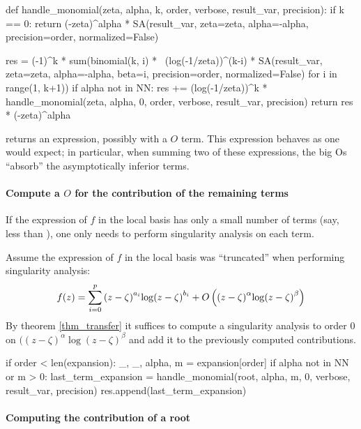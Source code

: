 \documentclass[../main.tex]{subfiles}
\begin{document}
\begin{pyblock}
def handle_monomial(zeta, alpha, k, order, verbose, result_var, precision):
	if k == 0:
		return (-zeta)^alpha * SA(result_var, zeta=zeta, alpha=-alpha,
								  precision=order, normalized=False)
	
	res = (-1)^k * sum(binomial(k, i) * \
						(log(-1/zeta))^(k-i) * SA(result_var,
												  zeta=zeta,
												  alpha=-alpha,
												  beta=i,
												  precision=order,
												  normalized=False)
					   for i in range(1, k+1))
	if alpha not in NN:
		res += (log(-1/zeta))^k * handle_monomial(zeta, alpha, 0,
												  order, verbose,
												  result_var, precision)
	return res * (-zeta)^alpha
\end{pyblock}

\begin{remark}
	 returns an expression, possibly with a $O$ term. This expression behaves as one would expect; in particular, when summing two of these expressions, the big Os ``absorb'' the asymptotically inferior terms.
\end{remark}

\paragraph{Compute a $O$ for the contribution of the remaining terms}

If the expression of $f$ in the local basis has only a small number of terms (say, less than ), one only needs to perform singularity analysis on each term.

Assume the expression of $f$ in the local basis was ``truncated'' when performing singularity analysis:
$$f(z) = \sum\limits_{i=0}^p {(z-\zeta)}^{a_i} {\log (z-\zeta)}^{b_i} + O \left( {(z-\zeta)}^\alpha {\log (z-\zeta)}^\beta \right)$$
By theorem \ref{thm_transfer} it suffices to compute a singularity analysis to order 0 on $({(z-\zeta)}^\alpha {\log (z-\zeta)}^\beta$ and add it to the previously computed contributions.

\begin{pyblock}
if order < len(expansion):
	_, _, alpha, m = expansion[order]
	if alpha not in NN or m > 0:
		last_term_expansion = handle_monomial(root, alpha, m, 0, verbose,
											  result_var, precision)
		res.append(last_term_expansion)
\end{pyblock}


\paragraph{Computing the contribution of a root}
\end{document}

